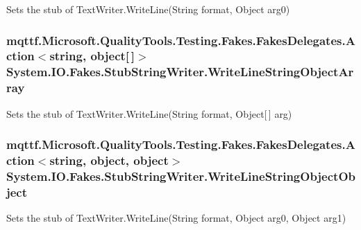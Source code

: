 Sets the stub of Text\-Writer.\-Write\-Line(\-String format, Object arg0)

\hypertarget{class_system_1_1_i_o_1_1_fakes_1_1_stub_string_writer_a53b8b66446065b6402c43e749c616269}{
\subsubsection[{Write\-Line\-String\-Object\-Array}]{\setlength{\rightskip}{0pt plus 5cm}mqttf.\-Microsoft.\-Quality\-Tools.\-Testing.\-Fakes.\-Fakes\-Delegates.\-Action$<$string, object\mbox{[}$\,$\mbox{]}$>$ System.\-I\-O.\-Fakes.\-Stub\-String\-Writer.\-Write\-Line\-String\-Object\-Array}}\label{class_system_1_1_i_o_1_1_fakes_1_1_stub_string_writer_a53b8b66446065b6402c43e749c616269}


Sets the stub of Text\-Writer.\-Write\-Line(\-String format, Object\mbox{[}$\,$\mbox{]} arg)

\hypertarget{class_system_1_1_i_o_1_1_fakes_1_1_stub_string_writer_a4797006ac16ff49c2215e0c9549d56b1}{
\subsubsection[{Write\-Line\-String\-Object\-Object}]{\setlength{\rightskip}{0pt plus 5cm}mqttf.\-Microsoft.\-Quality\-Tools.\-Testing.\-Fakes.\-Fakes\-Delegates.\-Action$<$string, object, object$>$ System.\-I\-O.\-Fakes.\-Stub\-String\-Writer.\-Write\-Line\-String\-Object\-Object}}\label{class_system_1_1_i_o_1_1_fakes_1_1_stub_string_writer_a4797006ac16ff49c2215e0c9549d56b1}


Sets the stub of Text\-Writer.\-Write\-Line(\-String format, Object arg0, Object arg1)

